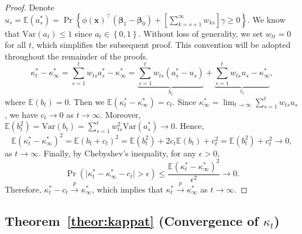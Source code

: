 \documentclass[12pt]{article}
\begin{document}
\begin{proof}
    Denote $u_s = \mathbb{E}(a_s^\ast) = \Pr\!\left\{\phi(\bm{x})^{\top} (\bm{\beta}_1-\bm{\beta}_0) + \left[\sum_{k=s+1}^\infty w_{ks}\right]\gamma \ge 0\right\}$. We know that $\text{Var}(a_t) \le 1$ since $a_t \in \left\{0,1 \right\}.$
    Without loss of generality, we set $w_{tt} = 0$ for all $t$, which simplifies the subsequent proof. This convention will be adopted throughout the remainder of the proofs.
    \begin{equation*}
         \kappa_t^\ast -  \kappa_\infty^\ast = \sum_{s=1}^{t} w_{ts} a_s^\ast -  \kappa_\infty^\ast = \underbrace{\sum_{s=1}^{t} w_{ts} (a_s^\ast-u_s)}_{b_t} +\underbrace{\sum_{s=1}^{t} w_{ts}u_s -  \kappa_\infty^\ast}_{c_t},
    \end{equation*}
    where $\mathbb{E}(b_t) = 0$. Then we $\mathbb{E}( \kappa_t^\ast -  \kappa_\infty^\ast) = c_t$.
    Since $ \kappa_\infty^\ast = \lim_{t \to \infty} \sum_{s=1}^{t} w_{ts} u_s$, we have $c_t \to 0$ as $t \to \infty$. Moreover, $
    \mathbb{E}(b_t^2) = \text{Var}(b_t) = \sum_{s=1}^t w_{ts}^2 \text{Var}(a_s^\ast) \to 0. $ 
Hence,
\begin{equation*}
    \mathbb{E}\!\left( \kappa_t^\ast -  \kappa_\infty^\ast \right)^2 
    = \mathbb{E}\!\left(b_t + c_t \right)^2 
    = \mathbb{E}(b_t^2) + 2c_t \mathbb{E}(b_t) + c_t^2 
    = \mathbb{E}(b_t^2) + c_t^2 \to 0,
\end{equation*}
as $t \to \infty$. Finally, by Chebyshev’s inequality, for any $\epsilon > 0$,
\begin{equation*}
    \Pr\!\left(\big| \kappa_t^\ast -  \kappa_\infty^\ast - c_t\big| > \epsilon\right) 
    \le \frac{\mathbb{E}\!\left( \kappa_t^\ast -  \kappa_\infty^\ast \right)^2}{\epsilon^2} \to 0.
\end{equation*}
Therefore, $ \kappa_t^\ast - c_t \stackrel{p}{\to}  \kappa_\infty^\ast$, which implies that $ \kappa_t^\ast \stackrel{p}{\to}  \kappa_\infty^\ast$ as $t \to \infty$.

\end{proof}


\subsection{Theorem~\ref{theor:kappat} (Convergence of $ \kappa_t$)}
\label{app:kappa}
\end{document}
